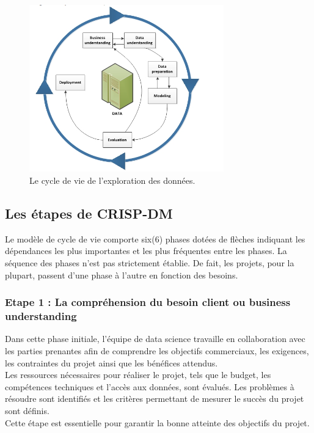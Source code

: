 \documentclass[a4paper,12pt]{report}
\begin{document}
        \clearpage
        \begin{figure}[htbp]
                \centering
                \includegraphics[width=0.75\textwidth]{crispdm}
                \caption{Le cycle de vie de l'exploration des données.}
                \label{fig:mesh1}
        \end{figure} 

        \subsection{Les étapes de CRISP-DM}
        Le modèle de cycle de vie comporte six(6) phases dotées de flèches indiquant les dépendances les plus importantes et les plus fréquentes entre les phases. La séquence des phases n'est pas strictement établie. De fait, les projets, pour la plupart, passent d'une phase à l'autre en fonction des besoins. 

            \subsubsection{Etape 1 : La compréhension du besoin client ou business understanding}
            Dans cette phase initiale, l’équipe de data science travaille en collaboration avec les parties prenantes afin de comprendre les objectifs commerciaux, les exigences, les contraintes du projet ainsi que les bénéfices attendus.\\ 
            Les ressources nécessaires pour réaliser le projet, tels que le budget, les compétences techniques et l'accès aux données, sont évalués. Les problèmes à résoudre sont identifiés et les critères permettant de mesurer le succès du projet sont définis. \\
            Cette étape est essentielle pour garantir la bonne atteinte des objectifs du projet.
    
\end{document}
